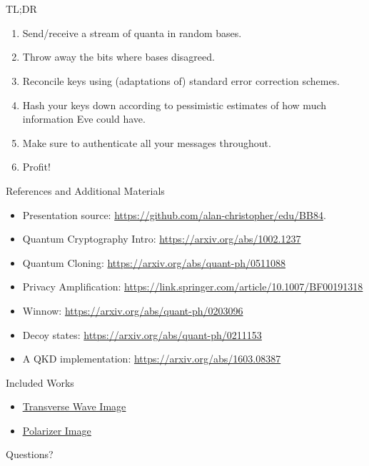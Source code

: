 \documentclass[pdf]{beamer}
\makeatletter
\def\beamer@writeslidentry@miniframesoff{%
  \expandafter\beamer@ifempty\expandafter{\beamer@framestartpage}{}%
  {%
    \clearpage\beamer@notesactions%
  }
}
\newcommand*{\miniframesoff}{\let\beamer@writeslidentry=\beamer@writeslidentry@miniframesoff}
\makeatother
\begin{document}
\miniframesoff
\section*{}
\begin{frame}{TL;DR}
  \begin{enumerate}
  \item Send/receive a stream of quanta in random bases.
  \item Throw away the bits where bases disagreed.
  \item Reconcile keys using (adaptations of) standard error correction schemes.
  \item Hash your keys down according to pessimistic estimates of how much
    information Eve could have.
  \item Make sure to authenticate all your messages throughout.
  \item Profit!
  \end{enumerate}
\end{frame}

\begin{frame}{References and Additional Materials}
  \begin{itemize}
  \item Presentation source:
    \url{https://github.com/alan-christopher/edu/BB84}.
  \item Quantum Cryptography Intro: \url{https://arxiv.org/abs/1002.1237}
  \item Quantum Cloning: \url{https://arxiv.org/abs/quant-ph/0511088}
  \item Privacy Amplification: \url{https://link.springer.com/article/10.1007/BF00191318}
  \item Winnow: \url{https://arxiv.org/abs/quant-ph/0203096}
  \item Decoy states: \url{https://arxiv.org/abs/quant-ph/0211153} %
  \item A QKD implementation: \url{https://arxiv.org/abs/1603.08387}
  \end{itemize}
\end{frame}

\begin{frame}{Included Works}
  \begin{itemize}
  \item \underline{\href{https://commons.wikimedia.org/wiki/File:EM-Wave.gif}{Transverse Wave Image}}
  \item \underline{\href{https://commons.wikimedia.org/wiki/File:Loi_de_malus.png}{Polarizer Image}}
  \end{itemize}
\end{frame}

\begin{frame}{Questions?}
\end{frame}
\end{document}
